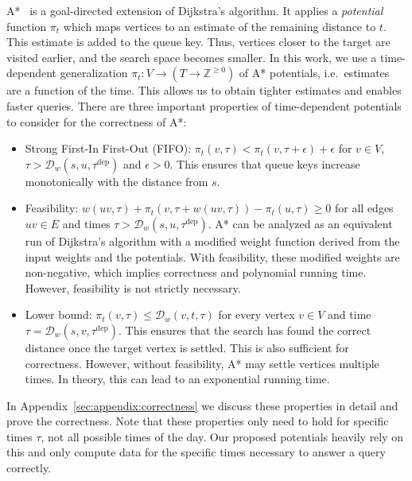 \documentclass[a4paper,UKenglish,cleveref, autoref, thm-restate,anonymous]{lipics-v2021}
\newcommand*{\dist}{\mathcal{D}}
\newcommand*{\tdep}{\tau^{\operatorname{dep}}}
\begin{document}
A*~\cite{hnr-afbhd-68} is a goal-directed extension of Dijkstra's algorithm.
It applies a \emph{potential} function $\pi_t$ which maps vertices to an estimate of the remaining distance to $t$.
This estimate is added to the queue key.
Thus, vertices closer to the target are visited earlier, and the search space becomes smaller.
%
In this work, we use a time-dependent generalization $\pi_t : V \to (T \to \mathbb{Z}^{\geq 0})$ of A* potentials, i.e.\ estimates are a function of the time.
This allows us to obtain tighter estimates and enables faster queries.
There are three important properties of time-dependent potentials to consider for the correctness of A*:
\begin{itemize}
  \item Strong First-In First-Out (FIFO): $\pi_t(v, \tau) < \pi_t(v, \tau + \epsilon) + \epsilon$ for $v \in V$, $\tau > \dist_w(s,u,\tdep)$ and $\epsilon > 0$.
        This ensures that queue keys increase monotonically with the distance from $s$.
  \item Feasibility: $w(uv, \tau) + \pi_t(v, \tau + w(uv, \tau)) - \pi_t(u, \tau) \geq 0$ for all edges $uv \in E$ and times $\tau > \dist_w(s,u,\tdep)$.
        A* can be analyzed as an equivalent run of Dijkstra's algorithm with a modified weight function derived from the input weights and the potentials.
        With feasibility, these modified weights are non-negative, which implies correctness and polynomial running time.
        However, feasibility is not strictly necessary.
  \item Lower bound: $\pi_t(v, \tau) \leq \dist_w(v,t,\tau)$ for every vertex $v \in V$ and time $\tau = \dist_w(s,v,\tdep)$.
        This ensures that the search has found the correct distance once the target vertex is settled.
        This is also sufficient for correctness.
        However, without feasibility, A* may settle vertices multiple times.
        In theory, this can lead to an exponential running time.
\end{itemize}

In Appendix~\ref{sec:appendix:correctness} we discuss these properties in detail and prove the correctness.
Note that these properties only need to hold for specific times $\tau$, not all possible times of the day.
Our proposed potentials heavily rely on this and only compute data for the specific times necessary to answer a query correctly.
\end{document}

